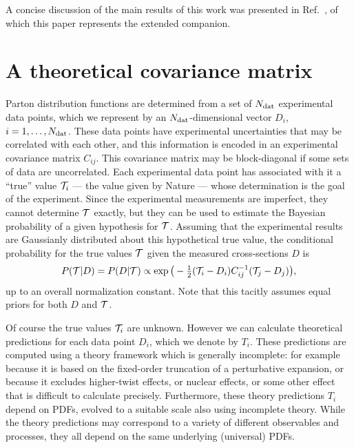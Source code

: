A concise discussion of the main results of this work was
presented in Ref.~\cite{AbdulKhalek:2019bux}, of
which this paper represents the extended companion.

\section{A theoretical covariance matrix}
\label{sec:thcovmat}

\newcommand\True{{\cal T}}

Parton distribution functions are determined from a set of $N_{\rm dat}$
experimental data points, which we represent by an $N_{\rm dat}$-dimensional
vector $D_i$, $i=1,\ldots,N_{\rm dat}$.
%
These data points have experimental
uncertainties that may be correlated with each other, and this
information is encoded
in an experimental covariance matrix $C_{ij}$.
%
This covariance matrix may be
block-diagonal if some sets of data are uncorrelated.
Each experimental data point has associated with it a
``true'' value $\True_i$ --- the value given by Nature ---  whose
determination is the goal of the experiment. Since the 
experimental measurements are imperfect, they cannot determine $\True$ 
exactly, but they can be used to estimate the Bayesian probability 
of a given hypothesis for $\True$. Assuming that the
 experimental results are Gaussianly distributed about this hypothetical true
 value, the conditional probability for the true values $\True$ given
 the measured cross-sections
$D$ is
\begin{equation}\label{eq:PDT}
P(\True|D)=P(D|\True) \propto \exp\big(-\half (\True_i-D_i)C_{ij}^{-1}(\True_j-D_j)\big),
\end{equation}
up to an overall normalization constant. Note that this tacitly assumes equal priors for both $D$ and $\True$.

Of course the true values $\True_i$ are unknown.
%
However we can
calculate theoretical predictions for each data point $D_i$, which we
denote by $T_i$.
%
These predictions are computed using a theory framework which is
generally incomplete: for example because it is based on the
fixed-order truncation of a perturbative expansion, or because it excludes 
higher-twist effects, or nuclear effects, or some other effect that 
is difficult to calculate precisely.
%
Furthermore, these theory predictions $T_i$ depend on PDFs,
evolved to a suitable scale also using incomplete theory.
%
While the theory predictions
may correspond to a variety of different observables and processes, 
they all depend on the same underlying (universal) PDFs.

